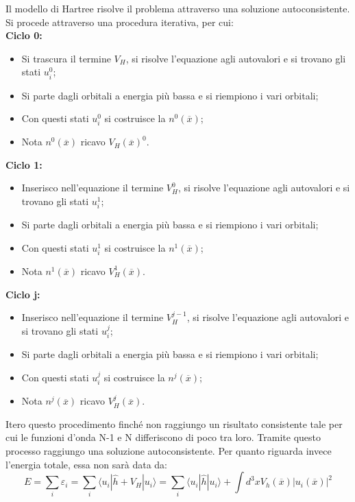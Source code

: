 Il modello di Hartree risolve il problema attraverso una soluzione autoconsistente. Si procede attraverso una procedura iterativa, per cui:
\\
\textbf{Ciclo 0:}
\begin{itemize}
    \item Si trascura il termine $V_H$, si risolve l'equazione agli autovalori e si trovano gli stati $u_i^0$;
    \item Si parte dagli orbitali a energia più bassa e si riempiono i vari orbitali;
    \item Con questi stati $u_i^0$ si costruisce la $n^0(\overline{x})$;
    \item Nota $n^0(\overline{x})$ ricavo $V_H(\overline x)^0$.
\end{itemize}
\textbf{Ciclo 1:}
\begin{itemize}
    \item Inserisco nell'equazione il termine $V_H^0$, si risolve l'equazione agli autovalori e si trovano gli stati $u_i^1$;
    \item Si parte dagli orbitali a energia più bassa e si riempiono i vari orbitali;
    \item Con questi stati $u_i^1$ si costruisce la $n^1(\overline{x})$;
    \item Nota $n^1(\overline{x})$ ricavo $V_H^1(\overline x)$.
\end{itemize}
\textbf{Ciclo j:}
\begin{itemize}
    \item Inserisco nell'equazione il termine $V_H^{j-1}$, si risolve l'equazione agli autovalori e si trovano gli stati $u_i^j$;
    \item Si parte dagli orbitali a energia più bassa e si riempiono i vari orbitali;
    \item Con questi stati $u_i^j$ si costruisce la $n^j(\overline{x})$;
    \item Nota $n^j(\overline{x})$ ricavo $V_H^j(\overline x)$.
\end{itemize}
Itero questo procedimento finché non raggiungo un risultato consistente tale per cui le funzioni d'onda N-1 e N differiscono di poco tra loro. Tramite questo processo raggiungo una soluzione autoconsistente.
Per quanto riguarda invece l'energia totale, essa non sarà data da:
\begin{equation*}
    E=\sum_i\varepsilon_i=\sum_i\langle u_i|\hat h + V_H|u_i\rangle=\sum_i \langle u_i|\hat h|u_i\rangle+\int d^3x V_h(\overline x)|u_i(\overline x)|^2
\end{equation*}
